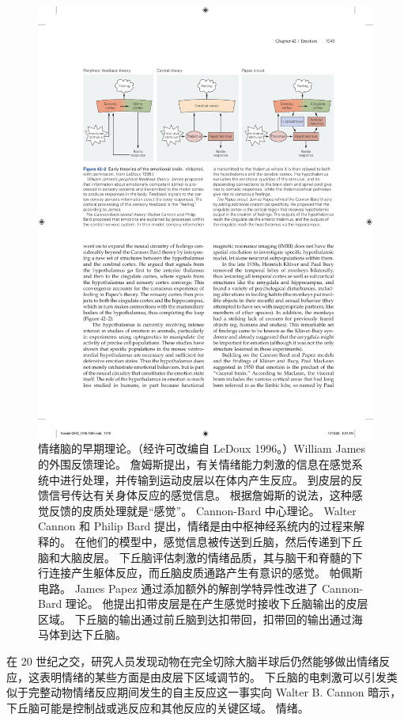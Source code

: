 \begin{figure}[htbp]
	\centering
	\includegraphics[width=0.95\linewidth]{chap42/fig_42_2}
	\caption{情绪脑的早期理论。（经许可改编自 LeDoux 1996。）William James 的外围反馈理论。 詹姆斯提出，有关情绪能力刺激的信息在感觉系统中进行处理，并传输到运动皮层以在体内产生反应。 到皮层的反馈信号传达有关身体反应的感觉信息。 根据詹姆斯的说法，这种感觉反馈的皮质处理就是“感觉”。 Cannon-Bard 中心理论。 Walter Cannon 和 Philip Bard 提出，情绪是由中枢神经系统内的过程来解释的。 在他们的模型中，感觉信息被传送到丘脑，然后传递到下丘脑和大脑皮层。 下丘脑评估刺激的情绪品质，其与脑干和脊髓的下行连接产生躯体反应，而丘脑皮质通路产生有意识的感觉。 帕佩斯电路。 James Papez 通过添加额外的解剖学特异性改进了 Cannon-Bard 理论。 他提出扣带皮层是在产生感觉时接收下丘脑输出的皮层区域。 下丘脑的输出通过前丘脑到达扣带回，扣带回的输出通过海马体到达下丘脑。}
	\label{fig:42_2}
\end{figure}


在 20 世纪之交，研究人员发现动物在完全切除大脑半球后仍然能够做出情绪反应，这表明情绪的某些方面是由皮层下区域调节的。
下丘脑的电刺激可以引发类似于完整动物情绪反应期间发生的自主反应这一事实向 Walter B. Cannon 暗示，下丘脑可能是控制战或逃反应和其他反应的关键区域。 情绪。


